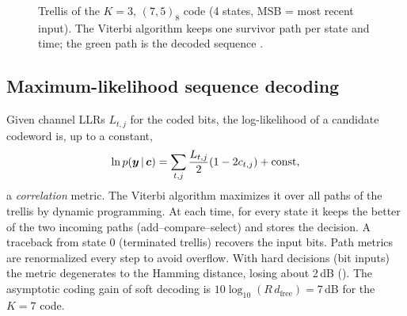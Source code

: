 \begin{figure}[htbp]
\centering
{}
\caption{Trellis of the $K=3$, $(7,5)_8$ code (4 states, MSB = most recent input). The Viterbi
algorithm keeps one survivor path per state and time; the green path is the decoded sequence
.}
\label{fig:trellis}
\end{figure}

\subsection{Maximum-likelihood sequence decoding}
Given channel LLRs $L_{t,j}$ for the coded bits, the log-likelihood of a candidate codeword is,
up to a constant,
\begin{equation}
  \ln p(\bm{y}\,|\,\bm{c})=\sum_{t,j}\frac{L_{t,j}}{2}(1-2c_{t,j})+\text{const},
\end{equation}
a \emph{correlation} metric. The Viterbi algorithm maximizes it over all paths of the trellis
by dynamic programming. At each time, for every state it keeps the better of the two incoming
paths (add--compare--select) and stores the decision. A traceback from state 0 (terminated
trellis) recovers the input bits. Path metrics are renormalized every step to avoid overflow.
With hard decisions (bit inputs) the metric degenerates to the Hamming distance, losing about
2\,dB (). The asymptotic coding gain
of soft decoding is $10\log_{10}(R\,d_{\mathrm{free}})=7$\,dB for the $K=7$ code.

